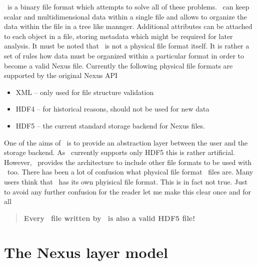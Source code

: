 \nexus\ is a binary file format which attempts to solve all of these problems.
\nexus\ can keep scalar and multidimensional data within a single file and allows
to organize the data within the file in a tree like mannger. Additional
attributes can be attached to each object in a file, storing metadata which might
be required for later analysis. It must be noted that \nexus\ is not a
physical file format itself. It is rather a set of rules how data must be
organized within a particular format in order to become a valid Nexus file.
Currently the following physical file formats are supported by the original
Nexus API
\begin{itemize}
\item XML -- only used for file structure validation
\item HDF4 -- for historical reasons, should not be used for new data
\item HDF5 -- the current standard storage backend for Nexus files. 
\end{itemize}
One of the aims of \libpniio\ is to provide an abstraction layer between the
user and the storage backend. As \libpniio\ currently supports only HDF5 this is
rather artificial. However, \libpniio\ provides the architecture to include
other file formats to be used with \nexus\ too. 
There has been a lot of confusion what physical file format \nexus\ files are.
Many users think that \nexus\ has its own phyisical file format. This is in fact
not true. Just to avoid any further confusion for the reader let me make this
clear once and for all
\begin{quote}
\huge\sffamily\textbf{Every \nexus\ file written by \libpniio\ is also a valid HDF5 file!}
\end{quote}

\section{The Nexus layer model}

